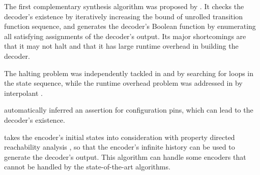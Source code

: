 \documentclass[twocolumn]{article}
\makeatletter
\def\subsection{\@startsection {subsection}{2}{\z@}{16pt plus 2pt minus 2pt}
{6pt plus 2pt minus 2pt}{\normalsize\sl
\edef\@svsec{\thesubsection.\ }}}
\def\thesubsection{\Alph{subsection}}
\makeatother
\begin{document}
The first complementary synthesis algorithm was proposed by \cite{ShenICCAD09}.
It checks the decoder's existence by iteratively increasing the bound of unrolled transition function sequence,
and generates the decoder's Boolean function by enumerating all satisfying assignments of the decoder's output.
Its major shortcomings are that it may not halt and that it has large runtime overhead
in building the decoder.

The halting problem was independently tackled in \cite{ShenTCAD11} and \cite{LiuICCAD11} by searching for loops in the state sequence,
while the runtime overhead problem was addressed in \cite{ShenTCAD12,LiuICCAD11} by interpolant \cite{interp_McMillan}.

\cite{ShenTCAD12} automatically inferred an assertion for configuration pins, 
which can lead to the decoder's existence.

\cite{TuDAC13} takes the encoder's initial states into consideration
with property directed reachability analysis \cite{EenFMCAD11},
so that the encoder's infinite history can be used to generate the decoder's output.
This algorithm can handle some encoders that cannot be handled by the state-of-the-art algorithms.

% 
% 
% 
\end{document}
